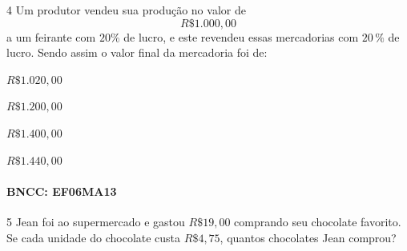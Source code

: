 {%

\num{4}  Um produtor vendeu sua produção no valor de $$R\$1.000,00$$ a um
feirante com $20\%$ de lucro, e este revendeu essas mercadorias com $20\,\%$
de lucro. Sendo assim o valor final da mercadoria foi de:

\begin{escolha}
\item $R\$1.020,00$
\item $R\$1.200,00$
\item $R\$1.400,00$
\item $R\$1.440,00$
\end{escolha}

\paragraph{BNCC: EF06MA13 }


\num{5}  Jean foi ao supermercado e gastou $R\$19,00$ comprando seu chocolate
favorito. Se cada unidade do chocolate custa $R\$4,75$, quantos
chocolates Jean comprou?

}

